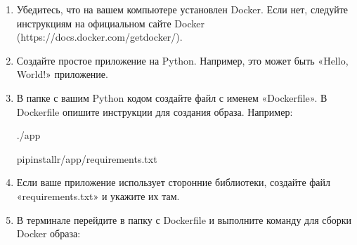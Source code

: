 \documentclass[letterpaper,10pt,russian]{sphinxmanual}
\begin{document}
\sphinxAtStartPar
{}
\begin{enumerate}
%
\item {} 
\sphinxAtStartPar
{} Убедитесь, что на вашем компьютере установлен Docker. Если нет, следуйте инструкциям на официальном сайте Docker (https://docs.docker.com/get\sphinxhyphen{}docker/).

\item {} 
\sphinxAtStartPar
{} Создайте простое приложение на Python. Например, это может быть «Hello, World!» приложение.

\item {} 
\sphinxAtStartPar
{} В папке с вашим Python кодом создайте файл с именем «Dockerfile». В Dockerfile опишите инструкции для создания образа. Например:

\begin{sphinxVerbatim}[commandchars=\\\{\}]

./app

pipinstall\PYGZhy{}r/app/requirements.txt


\PYG{p}{[}\PYG{p}{]}
\end{sphinxVerbatim}

\item {} 
\sphinxAtStartPar
{} Если ваше приложение использует сторонние библиотеки, создайте файл «requirements.txt» и укажите их там.

\item {} 
\sphinxAtStartPar
{} В терминале перейдите в папку с Dockerfile и выполните команду для сборки Docker образа:

\begin{sphinxVerbatim}[commandchars=\\\{\}]
    
\end{sphinxVerbatim}


\end{enumerate}
\end{document}
